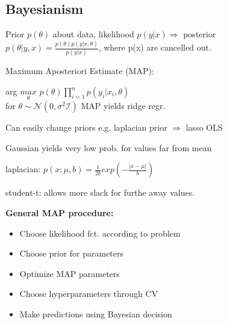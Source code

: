 \subsection{Bayesianism}

Prior $p(\theta)$ about data, likelihood $p(y|x) \Rightarrow$ posterior $p(\theta|y,x) = \frac{p(\theta) p(y|x,\theta)}{p(y|x)}$, where p(x) are cancelled out.

Maximum Aposteriori Estimate (MAP):
\begin{center}
    arg $\underset{\theta}{max}$ $p(\theta)\prod_{i=1}^n p(y_i|x_i,\theta)$
    \\ for $\theta \sim \mathcal{N}(0,\sigma^2\mathcal{I})$ MAP yields ridge regr.
\end{center}

Can easily change priors e.g. laplacian prior $\Rightarrow$ lasso OLS %

Gaussian yields very low prob. for values far from mean

laplacian: $p(x;\mu,b) = \frac{1}{2b}exp(-\frac{|x-\mu|}{b})$

student-t: allows more slack for furthe away values.

\textbf{General MAP procedure:} 
\begin{itemize}
    \item Choose likelihood fct. according to problem
    \item Choose prior for parameters
    \item Optimize MAP parameters
    \item Choose hyperparameters through CV
    \item Make predictions using Bayesian decision
\end{itemize}

